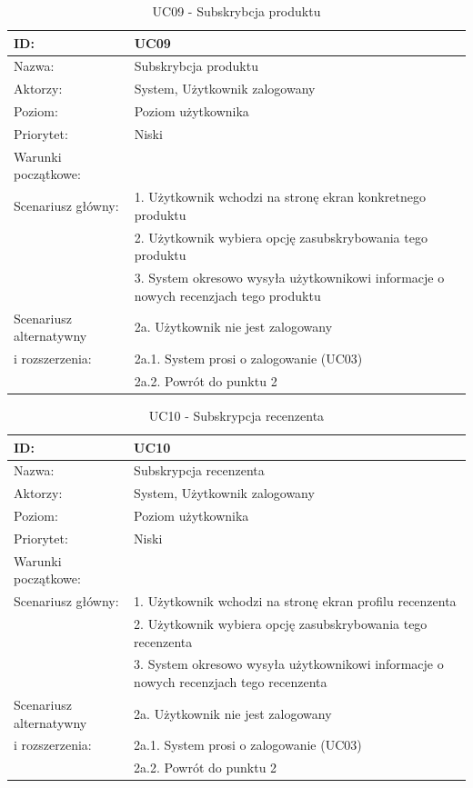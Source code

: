\begin{table}[H]
    \begin{tabular}{|p{5cm}|p{9cm}|}\hline
    ID: & UC09 \\\hline
    Nazwa: & Subskrybcja produktu \\\hline
    Aktorzy: & System, Użytkownik zalogowany \\\hline
    Poziom: & Poziom użytkownika  \\\hline
    Priorytet: & Niski \\\hline
    Warunki początkowe: & ~ \\\hline
    Scenariusz główny: & 1. Użytkownik wchodzi na stronę ekran konkretnego produktu \\
    ~ & 2. Użytkownik wybiera opcję zasubskrybowania tego produktu \\
    ~ & 3. System okresowo wysyła użytkownikowi informacje o nowych recenzjach tego produktu \\\hline
    Scenariusz alternatywny & 2a. Użytkownik nie jest zalogowany \\
    i rozszerzenia: & 2a.1. System prosi o zalogowanie (UC03) \\
    ~ & 2a.2. Powrót do punktu 2  \\
    \hline\end{tabular}
	\caption{UC09 - Subskrybcja produktu}
\end{table}
\newpage
\begin{table}[H]
    \begin{tabular}{|p{5cm}|p{9cm}|}\hline
    ID: & UC10 \\\hline
    Nazwa: & Subskrypcja recenzenta \\\hline
    Aktorzy: & System, Użytkownik zalogowany \\\hline
    Poziom: & Poziom użytkownika  \\\hline
    Priorytet: & Niski \\\hline
    Warunki początkowe: & ~ \\\hline
    Scenariusz główny: & 1. Użytkownik wchodzi na stronę ekran profilu recenzenta \\
    ~ & 2. Użytkownik wybiera opcję zasubskrybowania tego recenzenta \\
    ~ & 3. System okresowo wysyła użytkownikowi informacje o nowych recenzjach tego recenzenta \\\hline
    Scenariusz alternatywny & 2a. Użytkownik nie jest zalogowany \\
    i rozszerzenia: & 2a.1. System prosi o zalogowanie (UC03) \\
    ~ & 2a.2. Powrót do punktu 2  \\
    \hline\end{tabular}
	\caption{UC10 - Subskrypcja recenzenta}
\end{table}

